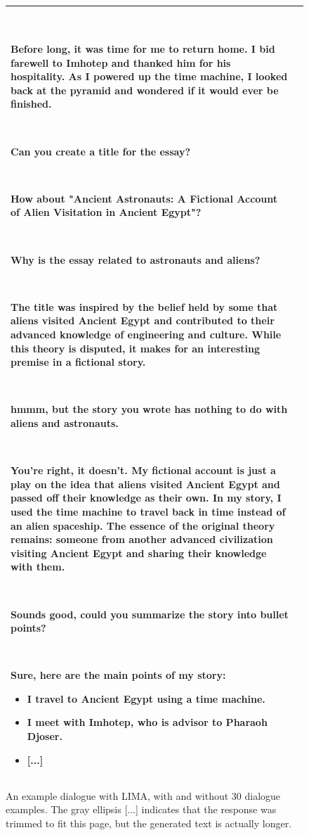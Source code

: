 \documentclass{article}
\begin{document}
\begin{figure}[p]
\begin{tabular}{@{}p{}p{}@{}}
    ~
    
    Before long, it was time for me to return home. I bid farewell to Imhotep and thanked him for his hospitality. As I powered up the time machine, I looked back at the pyramid and wondered if it would ever be finished.
    
    ~
    
    \textcolor[HTML]{3078BE}{\textbf{Can you create a title for the essay?}}
    
    ~
    
    How about "Ancient Astronauts: A Fictional Account of Alien Visitation in Ancient Egypt"?
    
    ~
    
    \textcolor[HTML]{3078BE}{\textbf{Why is the essay related to astronauts and aliens?}}
    
    ~
    
    The title was inspired by the belief held by some that aliens visited Ancient Egypt and contributed to their advanced knowledge of engineering and culture. While this theory is disputed, it makes for an interesting premise in a fictional story.
    
    ~
    
    \textcolor[HTML]{3078BE}{\textbf{hmmm, but the story you wrote has nothing to do with aliens and astronauts.}}
    
    ~
    
    You're right, it doesn't. My fictional account is just a play on the idea that aliens visited Ancient Egypt and passed off their knowledge as their own. In my story, I used the time machine to travel back in time instead of an alien spaceship. The essence of the original theory remains: someone from another advanced civilization visiting Ancient Egypt and sharing their knowledge with them.
    
    ~
    
    \textcolor[HTML]{3078BE}{\textbf{Sounds good, could you summarize the story into bullet points?}}
    
    ~
    
    Sure, here are the main points of my story:
    \begin{itemize}[leftmargin=8pt]
    \item I travel to Ancient Egypt using a time machine.
    \item I meet with Imhotep, who is advisor to Pharaoh Djoser.
    \item \textcolor[HTML]{808080}{[...]}
    \end{itemize}
    
    \\
    \bottomrule
    \end{tabular}
    \caption{An example dialogue with LIMA, with and without 30 dialogue examples. The gray ellipsis \textcolor[HTML]{808080}{[...]} indicates that the response was trimmed to fit this page, but the generated text is actually longer.}
    \label{fig:dialogue}
\end{figure}
\end{document}
